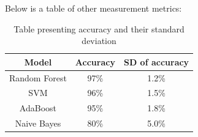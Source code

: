 \documentclass[conference]{IEEEtran}
\begin{document}
Below is a table of other measurement metrics:

\begin{table}[H]
    \caption{Table presenting accuracy and their standard deviation}
    \begin{center}
        \begin{tabular}{|c|c|c|}
            \hline
            \textbf{Model} & \textbf{Accuracy} & \textbf{SD of accuracy} \\
            \hline
            Random Forest & 97\% & 1.2\% \\
            SVM & 96\% & 1.5\% \\
            AdaBoost & 95\% & 1.8\% \\
            Naive Bayes & 80\% & 5.0\% \\
            \hline
        \end{tabular}
    \end{center}
    \label{SD_tab}
\end{table}
\end{document}
